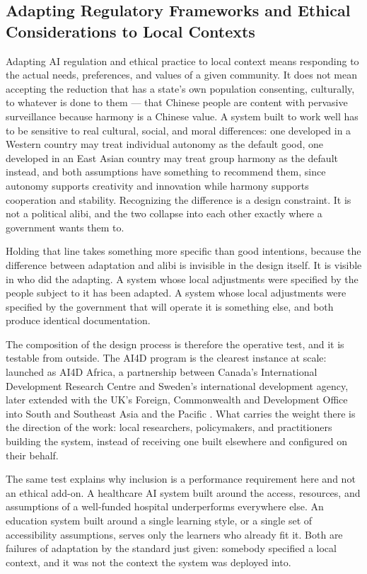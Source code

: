 \subsection{Adapting Regulatory Frameworks and Ethical Considerations to Local Contexts}
\label{sec:8.7.5}
Adapting AI regulation and ethical practice to local context means responding to the actual needs, preferences, and values of a given community. It does not mean accepting the reduction that has a state's own population consenting, culturally, to whatever is done to them — that Chinese people are content with pervasive surveillance because harmony is a Chinese value. A system built to work well has to be sensitive to real cultural, social, and moral differences: one developed in a Western country may treat individual autonomy as the default good, one developed in an East Asian country may treat group harmony as the default instead, and both assumptions have something to recommend them, since autonomy supports creativity and innovation while harmony supports cooperation and stability. Recognizing the difference is a design constraint. It is not a political alibi, and the two collapse into each other exactly where a government wants them to.

Holding that line takes something more specific than good intentions, because the difference between adaptation and alibi is invisible in the design itself. It is visible in who did the adapting. A system whose local adjustments were specified by the people subject to it has been adapted. A system whose local adjustments were specified by the government that will operate it is something else, and both produce identical documentation.

The composition of the design process is therefore the operative test, and it is testable from outside. The AI4D program is the clearest instance at scale: launched as AI4D Africa, a partnership between Canada's International Development Research Centre and Sweden's international development agency, later extended with the UK's Foreign, Commonwealth and Development Office into South and Southeast Asia and the Pacific \autocite{idrc2024ai4d}. What carries the weight there is the direction of the work: local researchers, policymakers, and practitioners building the system, instead of receiving one built elsewhere and configured on their behalf.

The same test explains why inclusion is a performance requirement here and not an ethical add-on. A healthcare AI system built around the access, resources, and assumptions of a well-funded hospital underperforms everywhere else. An education system built around a single learning style, or a single set of accessibility assumptions, serves only the learners who already fit it. Both are failures of adaptation by the standard just given: somebody specified a local context, and it was not the context the system was deployed into.
